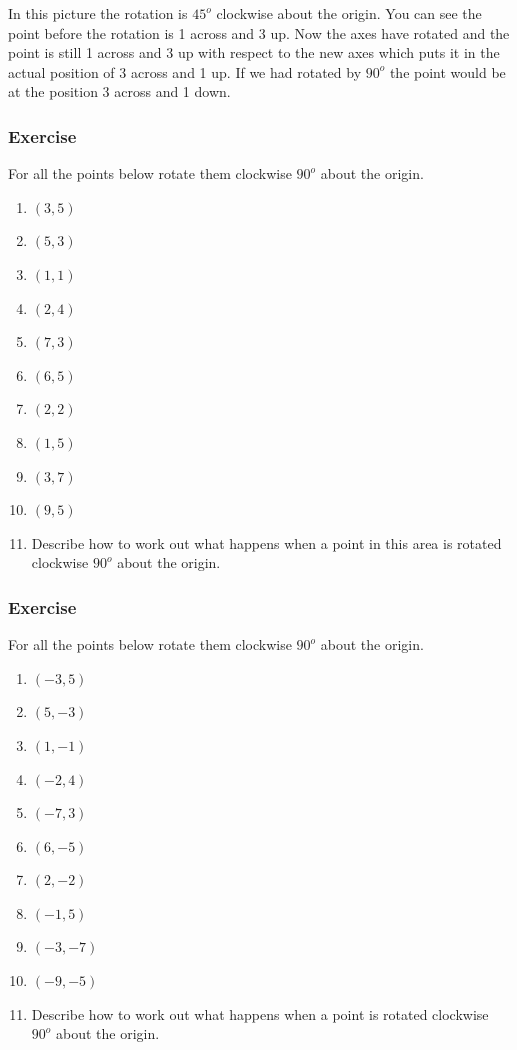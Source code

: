 \bigskip

In this picture the rotation is $45^o$ clockwise about the origin.  You can see the point before the rotation is 1 across and 3 up.  Now the axes have rotated and the point is still 1 across and 3 up with respect to the new axes which puts it in the actual position of 3 across and 1 up.  If we had rotated by $90^o$ the point would be at the position 3 across and 1 down.

\subsubsection{Exercise}
For all the points below rotate them clockwise $90^o$ about the origin.
\begin{enumerate}
	\item $(3, 5)$
	\item $(5, 3)$
	\item $(1, 1)$
	\item $(2, 4)$
	\item $(7, 3)$
	\item $(6, 5)$
	\item $(2, 2)$
	\item $(1, 5)$
	\item $(3, 7)$
	\item $(9, 5)$
	\item Describe how to work out what happens when a point in this area is rotated clockwise $90^o$ about the origin.
\end{enumerate}

\subsubsection{Exercise}
For all the points below rotate them clockwise $90^o$ about the origin.
\begin{enumerate}
	\item $(-3, 5)$
	\item $(5, -3)$
	\item $(1, -1)$
	\item $(-2, 4)$
	\item $(-7, 3)$
	\item $(6, -5)$
	\item $(2, -2)$
	\item $(-1, 5)$
	\item $(-3, -7)$
	\item $(-9, -5)$
	\item Describe how to work out what happens when a point is rotated clockwise $90^o$ about the origin.
\end{enumerate}
